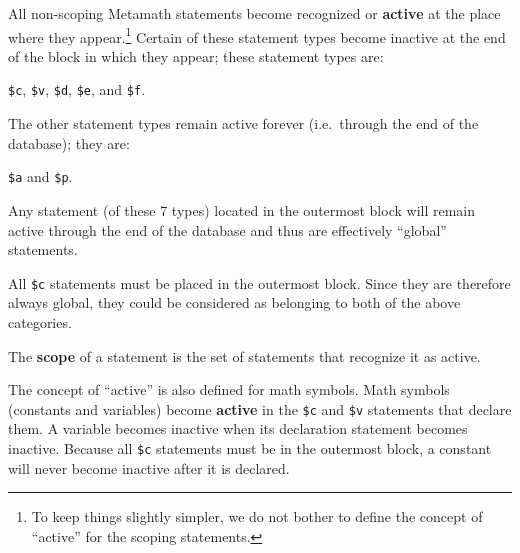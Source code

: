All non-scoping Metamath statements become recognized or {\bf
active} at the place where they appear.\footnote{To
keep things slightly simpler, we do not bother to define the concept of
``active'' for the scoping statements.}  Certain of these statement types
become inactive at the end of the block in which they appear; these statement
types are:
\begin{center}
  \texttt{\$c}, \texttt{\$v}, \texttt{\$d}, \texttt{\$e}, and \texttt{\$f}.
\end{center}
The other statement types remain active forever (i.e.\ through the end of the
database); they are:
\begin{center}
  \texttt{\$a} and \texttt{\$p}.
\end{center}
Any statement (of these 7 types) located in the outermost
block will remain active through the end of the
database and thus are effectively ``global'' statements.

All \texttt{\$c} statements must be placed in the outermost block.  Since they are
therefore always global, they could be considered as belonging to both of the
above categories.

The {\bf scope} of a statement is the set of statements that
recognize it as active.


The concept of ``active'' is also defined for math symbols.  Math symbols (constants and
variables) become {\bf active}
in the \texttt{\$c} and
\texttt{\$v} statements that declare them.
A variable becomes inactive when its declaration statement becomes
inactive.  Because all \texttt{\$c} statements must be in the outermost
block, a constant will never become inactive after it is declared.


